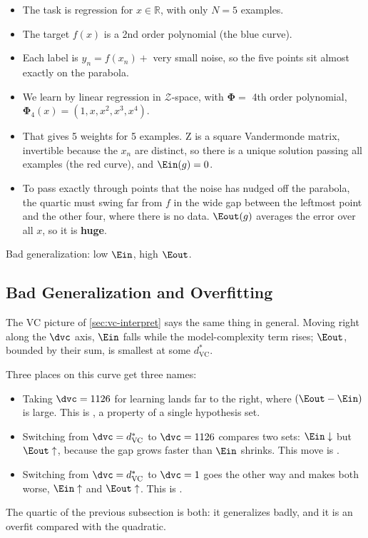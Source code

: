 \begin{itemize}
    \item The task is regression for \(x \in \mathbb{R}\), with only \(N = 5\)
        examples.
    \item The target \(f(x)\) is a 2nd order polynomial (the blue curve).
    \item Each label is \(y_n = f(x_n) + \) very small noise, so the five points
        sit almost exactly on the parabola.
    \item We learn by linear regression in \(\mathcal{Z}\)-space, with \(\bm{\Phi}
        = \) 4th order polynomial, \(\bm{\Phi}_4(x) = (1, x, x^2, x^3, x^4)\).
    \item That gives 5 weights for 5 examples. \(\mathrm{Z}\) is a square
        Vandermonde matrix, invertible because the \(x_n\) are distinct, so
        there is a unique solution passing all examples (the red curve), and
        \(\Ein(g) = 0\).
    \item To pass exactly through points that the noise has nudged off the
        parabola, the quartic must swing far from \(f\) in the wide gap between the
        leftmost point and the other four, where there is no data. \(\Eout(g)\) averages the error over all \(x\),
        so it is \textbf{huge}.
\end{itemize}

\begin{moral}
    Bad generalization: low \(\Ein\), high \(\Eout\).
\end{moral}

\subsection{Bad Generalization and Overfitting}

The VC picture of \autoref{sec:vc-interpret} says the same thing in general.
Moving right along the \(\dvc\) axis, \(\Ein\) falls while the model-complexity
term rises; \(\Eout\), bounded by their sum, is smallest at some
\(d_{\mathrm{VC}}^*\).

\begin{center}
    \vccurve
\end{center}

Three places on this curve get three names:
\begin{itemize}
    \item Taking \(\dvc = 1126\) for learning lands far to the right, where
        \((\Eout - \Ein)\) is large. This is , a
        property of a single hypothesis set.
    \item Switching from \(\dvc = d_{\mathrm{VC}}^*\) to \(\dvc = 1126\)
        compares two sets: \(\Ein \downarrow\) but \(\Eout \uparrow\), because
        the gap grows faster than \(\Ein\) shrinks. This move is
        .
    \item Switching from \(\dvc = d_{\mathrm{VC}}^*\) to \(\dvc = 1\) goes the
        other way and makes both worse, \(\Ein \uparrow\) and \(\Eout
        \uparrow\). This is .
\end{itemize}
The quartic of the previous subsection is both: it generalizes badly, and it
is an overfit compared with the quadratic.

